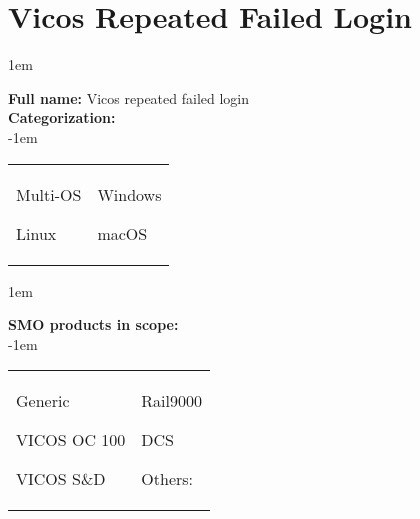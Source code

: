 
%
%

\section{Vicos Repeated Failed Login}
\label{15201}

\openup 1em

\textbf{Full name:} Vicos repeated failed login\hrulefill \\
{\bf Categorization:} \\

\openup -1em
\vspace{-3em}

\begin{tabular}{p{}p{}}

\begin{todolist}
  	\item Multi-OS
	\item Linux
\end{todolist}
&
\begin{todolist}
	\item[\done] Windows
	\item macOS
\end{todolist}

\end{tabular}

\openup 1em

{\bf SMO products in scope:} \\

\openup -1em
\vspace{-3em}

\begin{tabular}{p{}p{}}

\begin{todolist}
  \item Generic
  \item[\done] VICOS OC 100
  \item VICOS S\&D
\end{todolist}
&
\begin{todolist}
  \item Rail9000
  \item DCS
  \item Others: \hrulefill
\end{todolist}

\end{tabular}


